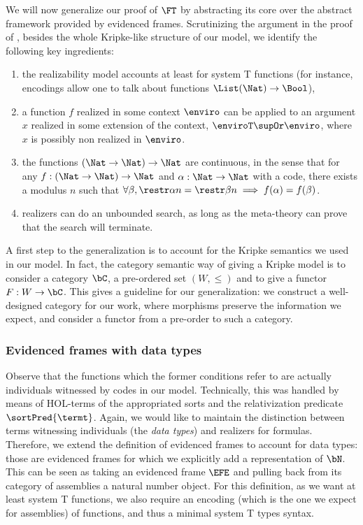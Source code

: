 

We will now generalize our proof of $\FT$ by abstracting its core over the
abstract framework provided by evidenced frames.
Scrutinizing the argument in the proof of ,
besides the whole Kripke-like structure of our model,
we identify the following key ingredients:
\begin{enumerate}
\item the realizability model accounts at least for system T functions (for instance,
encodings allow one to talk about functions $\List(\Nat) \to \Bool$),
\item a function $f$ realized in some context $\enviro$ can be applied to an argument $x$ realized in some extension of the context, $\enviroT \supOr \enviro$, where $x$ is possibly non realized in $\enviro$.
\item the functions $(\Nat \to \Nat) \to \Nat$ are continuous, in the sense that for any $f : (\Nat \to \Nat) \to \Nat$ and $\alpha : \Nat \to \Nat$ with a code, there exists a modulus $n$ such that $\forall \beta, \restr\alpha n = \restr \beta n \implies f(\alpha) = f(\beta)$.
\item realizers can do an unbounded search,
as long as the meta-theory can prove that the search will terminate.
\end{enumerate}

A first step to the generalization is to account for the Kripke semantics we used in our model.
In fact, the category semantic way of giving a Kripke model is to consider a category $\bC$,
a pre-ordered set $(W, \leq)$ and to give a functor $F : W \to \bC$.
This gives a guideline for our generalization: we construct a well-designed category for our work,
where morphisms preserve the information we expect, and consider a functor from a pre-order to such a category.


\subsubsection{Evidenced frames with data types}
Observe that the functions which the former conditions refer to
are actually individuals witnessed by codes in our model.
Technically, this was handled by means of HOL-terms of the appropriated sorts
and the relativization predicate $\sortPred{\termt}$.
Again, we would like to maintain the distinction between terms witnessing individuals (the \emph{data types})
and realizers for formulas.
Therefore, we extend the definition of evidenced frames to account for data types:
those are evidenced frames for which we explicitly add a representation of $\bN$.
This can be seen as taking an evidenced frame $\EFE$
and pulling back from its category of assemblies a natural number object.
For this definition, as we want at least system T functions,
we also require an encoding (which is the one we expect for assemblies)
of functions, and thus a minimal system T types syntax.


